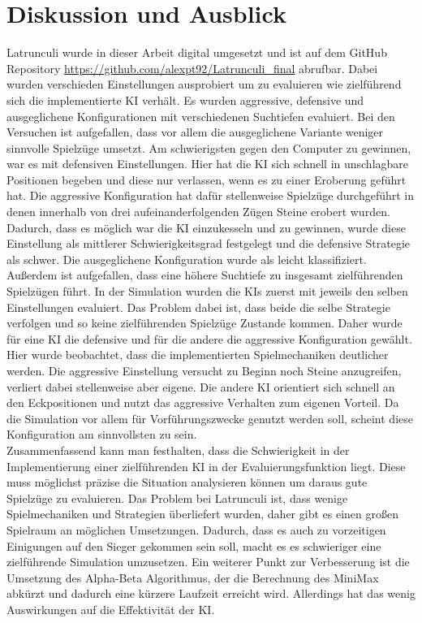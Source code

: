 
\chapter{Diskussion und Ausblick}
\label{ch:fazit}
Latrunculi wurde in dieser Arbeit digital umgesetzt und ist auf dem GitHub Repository \url{https://github.com/alexpt92/Latrunculi_final} abrufbar. Dabei wurden verschieden Einstellungen ausprobiert um zu evaluieren wie zielführend sich die implementierte KI verhält. Es wurden aggressive, defensive und ausgeglichene Konfigurationen mit verschiedenen Suchtiefen evaluiert. Bei den Versuchen ist aufgefallen, dass vor allem die ausgeglichene Variante weniger sinnvolle Spielzüge umsetzt. Am schwierigsten gegen den Computer zu gewinnen, war es mit defensiven Einstellungen. Hier hat die KI sich schnell in unschlagbare Positionen begeben und diese nur verlassen, wenn es zu einer Eroberung geführt hat. Die aggressive Konfiguration hat dafür stellenweise Spielzüge durchgeführt in denen innerhalb von drei aufeinanderfolgenden Zügen Steine erobert wurden. Dadurch, dass es möglich war die KI einzukesseln und zu gewinnen, wurde diese Einstellung als mittlerer Schwierigkeitsgrad festgelegt und die defensive Strategie als schwer. Die ausgeglichene Konfiguration wurde als leicht klassifiziert. Außerdem ist aufgefallen, dass eine höhere Suchtiefe zu insgesamt zielführenden Spielzügen führt. In der Simulation wurden die KIs zuerst mit jeweils den selben Einstellungen evaluiert. Das Problem dabei ist, dass beide die selbe Strategie verfolgen und so keine zielführenden Spielzüge Zustande kommen. Daher wurde für eine KI die defensive und für die andere die aggressive Konfiguration gewählt. Hier wurde beobachtet, dass die implementierten Spielmechaniken deutlicher werden. Die aggressive Einstellung versucht zu Beginn noch Steine anzugreifen, verliert dabei stellenweise aber eigene. Die andere KI orientiert sich schnell an den Eckpositionen und nutzt das aggressive Verhalten zum eigenen Vorteil. Da die Simulation vor allem für Vorführungszwecke genutzt werden soll, scheint diese Konfiguration am sinnvollsten zu sein.\\
Zusammenfassend kann man festhalten, dass die Schwierigkeit in der Implementierung einer zielführenden KI in der Evaluierungsfunktion liegt. Diese muss möglichst präzise die Situation analysieren können um daraus gute Spielzüge zu evaluieren. Das Problem bei Latrunculi ist, dass wenige Spielmechaniken und Strategien überliefert wurden, daher gibt es einen großen Spielraum an möglichen Umsetzungen. Dadurch, dass es auch zu vorzeitigen Einigungen auf den Sieger gekommen sein soll, macht es es schwieriger eine zielführende Simulation umzusetzen.
Ein weiterer Punkt zur Verbesserung ist die Umsetzung des Alpha-Beta Algorithmus, der die Berechnung des MiniMax abkürzt und dadurch eine kürzere Laufzeit erreicht wird. Allerdings hat das wenig Auswirkungen auf die Effektivität der KI.

